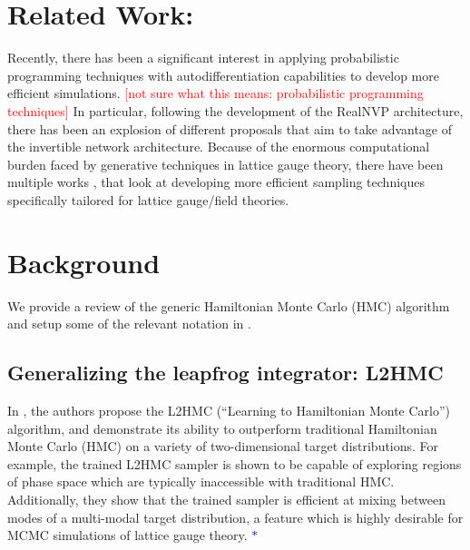 \documentclass{article} %
\newcommand{\JCO}[1]{\textcolor{red}{[#1]}}
\begin{document}
\section{\label{sec:related_work}Related Work:}
Recently, there has been a significant interest in applying probabilistic programming techniques with
autodifferentiation capabilities to develop more efficient simulations.
\JCO{not sure what this means: probabilistic programming techniques}
%
In particular, following the development of the RealNVP \citep{dinhRealNVP} architecture, there has been an explosion of
different proposals that aim to take advantage of the invertible network architecture.
%
Because of the enormous computational burden faced by generative techniques in lattice gauge theory, there have been
multiple works
\citep{%
   albergo2019flow,albergo2021introduction,favoni2020lattice,medvidovic2020generative,neklyudov2020orbital,
   neklyudov2020involutive, li2020neural,boyda2020sampling,kanwar2020equivariant,toth2019hamiltonian,
   hoffman2019neutra,wehenkel2020you,pasarica2010adaptively, dinhRealNVP,tanaka2017towards,schaefer2009investigating,
   cossu2018testing,rezende2020normalizing%
}, 
that look at developing more efficient sampling techniques specifically tailored for lattice gauge/field theories.
\section{\label{sec:background}Background}
We provide a review of the generic Hamiltonian Monte Carlo (HMC) algorithm and setup some of the relevant notation in
.
%
\subsection{\label{sec:l2hmc}Generalizing the leapfrog integrator: L2HMC}
%
In \citep{levy2017}, the authors propose the L2HMC (``Learning to Hamiltonian Monte Carlo'') algorithm, and demonstrate
its ability to outperform traditional Hamiltonian Monte Carlo (HMC) on a variety of two-dimensional target
distributions.
%
For example, the trained L2HMC sampler is shown to be capable of exploring regions of phase space which are typically
inaccessible with traditional HMC.\@
%
Additionally, they show that the trained sampler is efficient at mixing between modes of a multi-modal target
distribution, a feature which is highly desirable for MCMC simulations of lattice gauge
theory. \textcolor{blue}{\(\ast\)}%
\marginpar{\textcolor{blue}{\(\ast\) combine w/ prev. sentence}}
%
\end{document}
